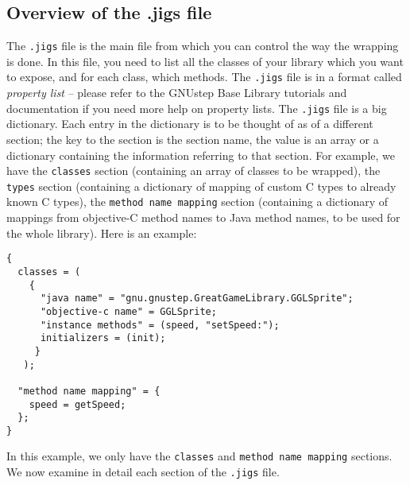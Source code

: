 \subsection{Overview of the .jigs file}
The \texttt{.jigs} file is the main file from which you can control
the way the wrapping is done.  In this file, you need to list all the
classes of your library which you want to expose, and for each class,
which methods.  The \texttt{.jigs} file is in a format called 
\emph{property list} -- please refer to the GNUstep Base Library tutorials 
and documentation if you need more help on property lists.  The
\texttt{.jigs} file is a big dictionary.  Each entry in the dictionary 
is to be thought of as of a different section; the key to the section
is the section name, the value is an array or a dictionary containing
the information referring to that section.  For example, we have the
\texttt{classes} section (containing an array of classes to be wrapped), the
\texttt{types} section (containing a dictionary of mapping of custom C 
types to already known C types), the \texttt{method name mapping}
section (containing a dictionary of mappings from objective-C method
names to Java method names, to be used for the whole library).  Here
is an example:
\begin{verbatim}
{
  classes = (
    {
      "java name" = "gnu.gnustep.GreatGameLibrary.GGLSprite";
      "objective-c name" = GGLSprite;
      "instance methods" = (speed, "setSpeed:");
      initializers = (init);
     }
   );
  
  "method name mapping" = {
    speed = getSpeed;
  };
}
\end{verbatim}

In this example, we only have the \texttt{classes} and \texttt{method
name mapping} sections.  We now examine in detail each section of the
\texttt{.jigs} file.

